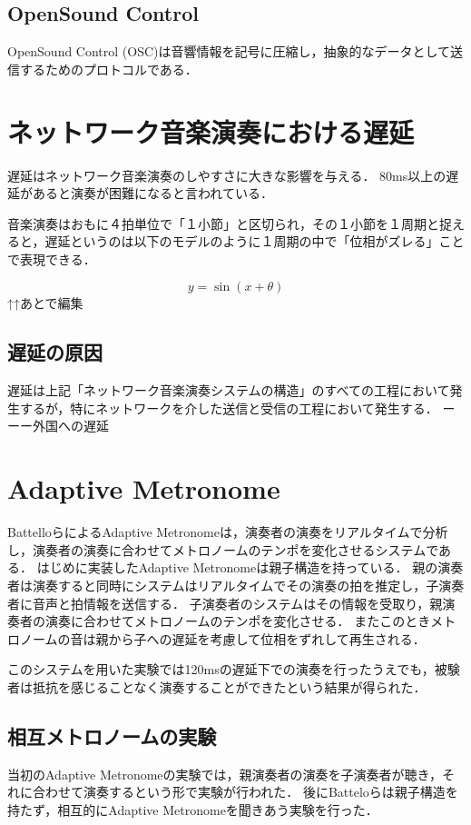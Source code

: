 \subsection{OpenSound Control}
OpenSound Control (OSC)は音響情報を記号に圧縮し，抽象的なデータとして送信するためのプロトコルである．

\section{ネットワーク音楽演奏における遅延}
遅延はネットワーク音楽演奏のしやすさに大きな影響を与える．
80ms以上の遅延があると演奏が困難になると言われている．

音楽演奏はおもに４拍単位で「１小節」と区切られ，その１小節を１周期と捉えると，遅延というのは以下のモデルのように１周期の中で「位相がズレる」ことで表現できる．

\begin{displaymath}
  y = \sin(x + \theta)
\end{displaymath}
↑↑あとで編集

\subsection{遅延の原因}
遅延は上記「ネットワーク音楽演奏システムの構造」のすべての工程において発生するが，特にネットワークを介した送信と受信の工程において発生する．
ーーー外国への遅延

\section{Adaptive Metronome}
BattelloらによるAdaptive Metronome\cite{admet}\cite{admet:experiment}は，演奏者の演奏をリアルタイムで分析し，演奏者の演奏に合わせてメトロノームのテンポを変化させるシステムである．
はじめに実装したAdaptive Metronomeは親子構造を持っている．
親の演奏者は演奏すると同時にシステムはリアルタイムでその演奏の拍を推定し，子演奏者に音声と拍情報を送信する．
子演奏者のシステムはその情報を受取り，親演奏者の演奏に合わせてメトロノームのテンポを変化させる．
またこのときメトロノームの音は親から子への遅延を考慮して位相をずれして再生される．

このシステムを用いた実験では120msの遅延下での演奏を行ったうえでも，被験者は抵抗を感じることなく演奏することができたという結果が得られた．\cite{admet}

\subsection{相互メトロノームの実験}
当初のAdaptive Metronomeの実験では，親演奏者の演奏を子演奏者が聴き，それに合わせて演奏するという形で実験が行われた．
後にBatteloらは親子構造を持たず，相互的にAdaptive Metronomeを聞きあう実験を行った．

